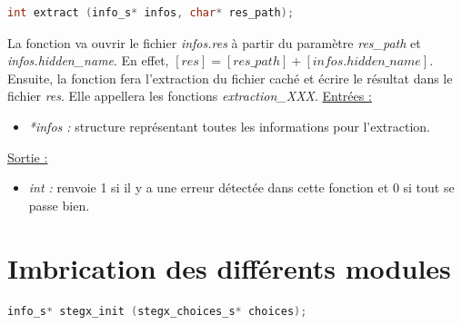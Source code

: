 \documentclass[11pt]{article}
\begin{document}


\begin{lstlisting}[language=c]
int extract (info_s* infos, char* res_path); 
\end{lstlisting}

La fonction va ouvrir le fichier \textit{infos.res} à partir du paramètre
\textit{res\_path} et \textit{infos.hidden\_name}. 
En effet, $[res] = [res\_path] + [infos.hidden\_name]$.
Ensuite, la fonction fera l'extraction du fichier caché et écrire le résultat 
dans le fichier \textit{res}. 
Elle appellera les fonctions \textit{extraction\_XXX}. 
\newline
\underline{Entrées :} 
\begin{itemize}
\item \textit{*infos :} structure représentant toutes les informations pour 
l'extraction.  
\end{itemize}
\underline{Sortie :} 
\begin{itemize}
\item \textit{int :} renvoie 1 si il y a une erreur détectée dans cette 
fonction et 0 si tout se passe bien.  
\newline 
\end{itemize}

\section{Imbrication des différents modules}

\begin{lstlisting}[language=c]
info_s* stegx_init (stegx_choices_s* choices);
\end{lstlisting}
\end{document}

